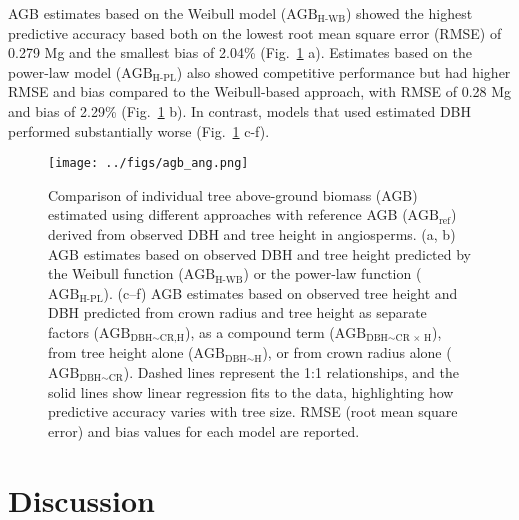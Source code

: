 \documentclass[
  12pt,
  letterpaper,
  DIV=11,
  numbers=noendperiod]{scrartcl}
\begin{document}
AGB estimates based on the Weibull model (\(\text{AGB}_\text{H-WB}\))
showed the highest predictive accuracy based both on the lowest root
mean square error (RMSE) of 0.279 Mg and the smallest bias of 2.04\%
(Fig.~\ref{fig-agb} a). Estimates based on the power-law model
(\(\text{AGB}_\text{H-PL}\)) also showed competitive performance but had
higher RMSE and bias compared to the Weibull-based approach, with RMSE
of 0.28 Mg and bias of 2.29\% (Fig.~\ref{fig-agb} b). In contrast,
models that used estimated DBH performed substantially worse
(Fig.~\ref{fig-agb} c-f).

\begin{figure}[H]

{\centering \texttt{[image: ../figs/agb\_ang.png]}

}

\caption{\label{fig-agb}Comparison of individual tree above-ground
biomass (AGB) estimated using different approaches with reference AGB
(\(\text{AGB}_\text{ref}\)) derived from observed DBH and tree height in
angiosperms. (a, b) AGB estimates based on observed DBH and tree height
predicted by the Weibull function (\(\text{AGB}_\text{H-WB}\)) or the
power-law function (\(\text{AGB}_\text{H-PL}\)). (c--f) AGB estimates
based on observed tree height and DBH predicted from crown radius and
tree height as separate factors
(\(\text{AGB}_{\text{DBH} \sim \text{CR,H}}\)), as a compound term
(\(\text{AGB}_{\text{DBH} \sim \text{CR × H}}\)), from tree height alone
(\(\text{AGB}_{\text{DBH} \sim \text{H}}\)), or from crown radius alone
(\(\text{AGB}_{\text{DBH} \sim \text{CR}}\)). Dashed lines represent the
1:1 relationships, and the solid lines show linear regression fits to
the data, highlighting how predictive accuracy varies with tree size.
RMSE (root mean square error) and bias values for each model are
reported.}

\end{figure}

\hypertarget{discussion}{%
\section{Discussion}\label{discussion}}
\end{document}
